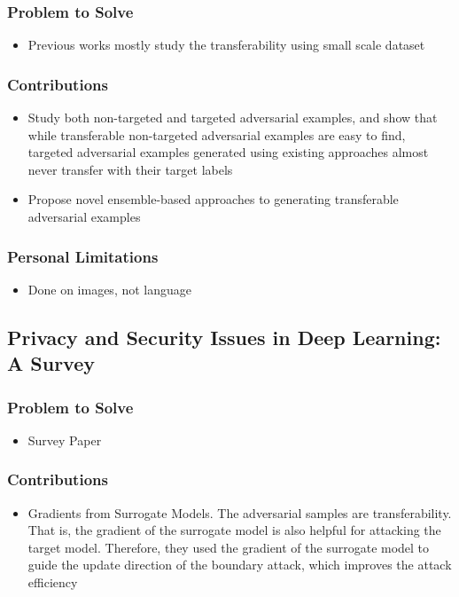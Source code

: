\documentclass{article}
\begin{document}
\begin{flushleft}
\subsubsection*{Problem to Solve}
\begin{itemize}
    \item Previous works mostly study the transferability using small scale dataset
\end{itemize}

\subsubsection*{Contributions}
\begin{itemize}
 \item Study both non-targeted and targeted adversarial examples, and show that while transferable non-targeted adversarial examples are easy to find, targeted adversarial examples generated using existing approaches almost never transfer with their target labels
\item Propose novel ensemble-based approaches to generating transferable adversarial examples
\end{itemize}

\subsubsection*{Personal Limitations}
\begin{itemize}
    \item Done on images, not language 
\end{itemize}





\subsection{ Privacy and Security Issues in Deep Learning: A Survey \cite{liu2020privacy}} 
\subsubsection*{Problem to Solve}
\begin{itemize}
    \item Survey Paper
\end{itemize}

\subsubsection*{Contributions}
\begin{itemize}
 \item Gradients from Surrogate Models. The adversarial samples are transferability. That is, the gradient of
the surrogate model is also helpful for attacking the target model. Therefore, they used the gradient of the
surrogate model to guide the update direction of the boundary attack, which improves the attack efficiency


\end{itemize}
\end{flushleft}
\end{document}
